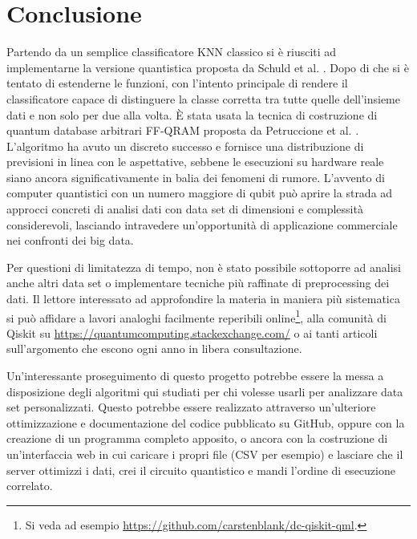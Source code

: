 \chapter{Conclusione}\label{ch:conclusione}

Partendo da un semplice classificatore \ac{KNN} classico 
si è riusciti ad implementarne la versione quantistica proposta 
da Schuld et al. \cite{schuld}. Dopo di che si è tentato di 
estenderne le funzioni, con l'intento principale di rendere il 
classificatore capace di distinguere la classe corretta tra 
tutte quelle dell'insieme dati e non solo per due alla volta. 
È stata usata la tecnica di 
costruzione di quantum database arbitrari \ac{FF-QRAM} proposta da 
Petruccione et al. \cite{petruccione}. L'algoritmo ha avuto un 
discreto successo e fornisce una distribuzione di previsioni 
in linea con le aspettative, sebbene le esecuzioni su hardware 
reale siano ancora significativamente in balia dei fenomeni di 
rumore. L'avvento di computer quantistici con un numero maggiore 
di qubit può aprire la strada ad approcci concreti di analisi 
dati con data set di dimensioni e complessità considerevoli, 
lasciando intravedere un'opportunità di applicazione 
commerciale nei confronti dei big data. 

Per questioni di limitatezza di tempo, non è stato possibile 
sottoporre ad analisi anche altri data set o implementare tecniche 
più raffinate di preprocessing dei dati. Il lettore interessato 
ad approfondire la materia in maniera più sistematica si può 
affidare a lavori analoghi facilmente reperibili 
online\footnote{Si veda ad esempio 
\url{https://github.com/carstenblank/dc-qiskit-qml}.}, alla comunità 
di Qiskit su \url{https://quantumcomputing.stackexchange.com/} o ai tanti 
articoli sull'argomento che escono ogni anno in libera consultazione. 

Un'interessante proseguimento di questo progetto potrebbe essere 
la messa a disposizione degli algoritmi qui studiati per chi volesse 
usarli per analizzare data set personalizzati. Questo potrebbe 
essere realizzato attraverso un'ulteriore ottimizzazione e 
documentazione del codice pubblicato su GitHub, oppure con la 
creazione di un programma completo apposito, o ancora con la 
costruzione di un'interfaccia web in cui caricare i propri file 
(CSV per esempio) e lasciare che il server ottimizzi i dati, crei 
il circuito quantistico e mandi l'ordine di esecuzione correlato. 


